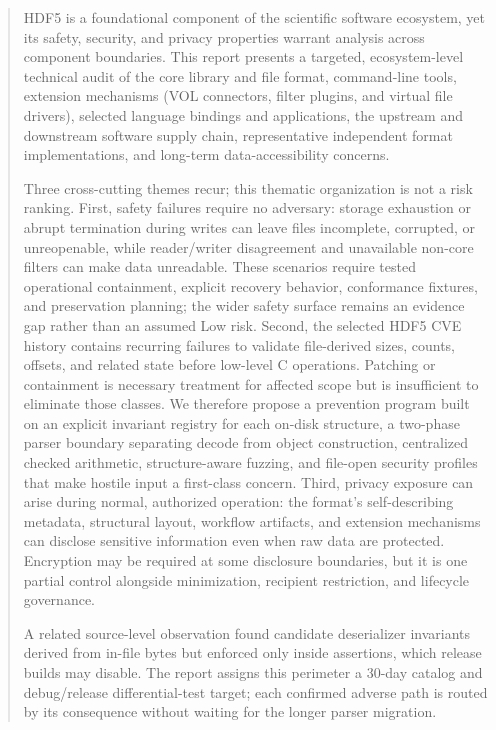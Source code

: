 \documentclass[../main.tex]{subfiles}
\begin{document}
\begin{abstract}

HDF5 is a foundational component of the scientific software ecosystem, yet its safety, security, and privacy properties warrant analysis across component boundaries. This report presents a targeted, ecosystem-level technical audit of the core library and file format, command-line tools, extension mechanisms (VOL connectors, filter plugins, and virtual file drivers), selected language bindings and applications, the upstream and downstream software supply chain, representative independent format implementations, and long-term data-accessibility concerns.

Three cross-cutting themes recur; this thematic organization is not a risk ranking. First, safety failures require no adversary: storage exhaustion or abrupt termination during writes can leave files incomplete, corrupted, or unreopenable, while reader/writer disagreement and unavailable non-core filters can make data unreadable. These scenarios require tested operational containment, explicit recovery behavior, conformance fixtures, and preservation planning; the wider safety surface remains an evidence gap rather than an assumed Low risk. Second, the selected HDF5 CVE history contains recurring failures to validate file-derived sizes, counts, offsets, and related state before low-level C operations. Patching or containment is necessary treatment for affected scope but is insufficient to eliminate those classes. We therefore propose a prevention program built on an explicit invariant registry for each on-disk structure, a two-phase parser boundary separating decode from object construction, centralized checked arithmetic, structure-aware fuzzing, and file-open security profiles that make hostile input a first-class concern. Third, privacy exposure can arise during normal, authorized operation: the format's self-describing metadata, structural layout, workflow artifacts, and extension mechanisms can disclose sensitive information even when raw data are protected. Encryption may be required at some disclosure boundaries, but it is one partial control alongside minimization, recipient restriction, and lifecycle governance.

A related source-level observation found candidate deserializer invariants derived from in-file bytes but enforced only inside assertions, which release builds may disable. The report assigns this perimeter a 30-day catalog and debug/release differential-test target; each confirmed adverse path is routed by its consequence without waiting for the longer parser migration.


\end{abstract}
\end{document}

